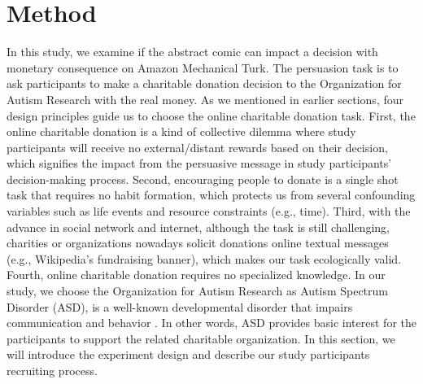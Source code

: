 \section{Method}
\label{sec:Method}
In this study, we examine if the abstract comic can impact a decision with monetary consequence on Amazon Mechanical Turk. The persuasion task is to ask participants to make a charitable donation decision to the Organization for Autism Research with the real money. As we mentioned in earlier sections, four design principles guide us to choose the online charitable donation task. First, the online charitable donation is a kind of collective dilemma where study participants will receive no external/distant rewards based on their decision, which signifies the impact from the persuasive message in study participants' decision-making process. Second, encouraging people to donate is a single shot task that requires no habit formation, which protects us from several confounding variables such as life events and resource constraints (e.g., time). Third, with the advance in social network and internet, although the task is still challenging, charities or organizations nowadays solicit donations online textual messages (e.g., Wikipedia's fundraising banner), which makes our task ecologically valid. Fourth, online charitable donation requires no specialized knowledge. In our study, we choose the Organization for Autism Research as Autism Spectrum Disorder (ASD), is a well-known developmental disorder that impairs communication and behavior \cite{american2013diagnostic}. In other words, ASD provides basic interest for the participants to support the related charitable organization. In this section, we will introduce the experiment design and describe our study participants recruiting process.


